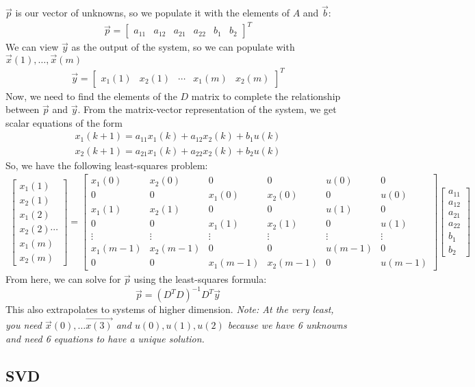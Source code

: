 $\vec{p}$ is our vector of unknowns, so we populate it with the elements of $A$ and $\vec{b}$:
\begin{align*}
    \vec{p} = \begin{bmatrix}
        a_{11} & a_{12} & a_{21} & a_{22} & b_1 & b_2
    \end{bmatrix}^T
\end{align*}
We can view $\vec{y}$ as the output of the system, so we can populate with $\vec{x}(1), \dots, \vec{x}(m)$
\begin{align*}
    \vec{y} = \begin{bmatrix}
        x_1(1) & x_2(1) & \cdots & x_1(m) & x_2(m)
    \end{bmatrix}^T
\end{align*}
Now, we need to find the elements of the $D$ matrix to complete the relationship between $\vec{p}$ and $\vec{y}$. 
From the matrix-vector representation of the system, we get scalar equations of the form
\begin{align*}
    x_1(k + 1) = a_{11} x_1(k) + a_{12} x_2(k) + b_1 u(k) \\
    x_2(k + 1) = a_{21} x_1(k) + a_{22} x_2(k) + b_2 u(k) 
\end{align*}
So, we have the following least-squares problem:
\begin{align*}
    \begin{bmatrix}
        x_1(1) \\ x_2(1) \\ x_1(2) \\ x_2(2) \cdots \\ x_1(m) \\ x_2(m)
    \end{bmatrix} = \begin{bmatrix}
        x_1(0) & x_2(0) & 0 & 0 & u(0) & 0 \\
        0 & 0 & x_1(0) & x_2(0) & 0 & u(0) \\
        x_1(1) & x_2(1) & 0 & 0 & u(1) & 0 \\
        0 & 0 & x_1(1) & x_2(1) & 0 & u(1) \\
        \vdots & \vdots & \vdots & \vdots & \vdots & \vdots \\
        x_1(m - 1) & x_2(m - 1) & 0 & 0 & u(m - 1) & 0 \\
        0 & 0 & x_1(m - 1) & x_2(m - 1) & 0 & u(m - 1)
    \end{bmatrix} \begin{bmatrix}
        a_{11} \\ a_{12} \\ a_{21} \\ a_{22} \\ b_1 \\ b_2
    \end{bmatrix}
\end{align*}
From here, we can solve for $\vec{p}$ using the least-squares formula:
$$\vec{p} = (D^T D)^{-1} D^T \vec{y}$$
This also extrapolates to systems of higher dimension.
\newline
\textit{Note: At the very least, you need $\vec{x}(0), \dots \vec{x(3)}$ and $u(0), u(1), u(2)$ because we have 6 unknowns and need 6 equations to have a unique solution.}

\subsection*{SVD}